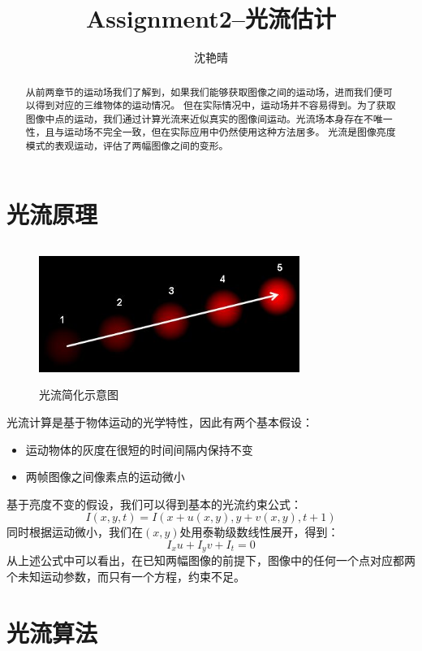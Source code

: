 \documentclass[UTF8]{ctexart}
\author{沈艳晴}
\title{Assignment2--光流估计}
\begin{document}
\begin{CJK*}{UTF8}{gbsn}
\CJKindent%
\maketitle


\begin{abstract}
从前两章节的运动场我们了解到，如果我们能够获取图像之间的运动场，进而我们便可以得到对应的三维物体的运动情况。
但在实际情况中，运动场并不容易得到。为了获取图像中点的运动，我们通过计算光流来近似真实的图像间运动。光流场本身存在不唯一性，且与运动场不完全一致，但在实际应用中仍然使用这种方法居多。
光流是图像亮度模式的表观运动，评估了两幅图像之间的变形。
\end{abstract}

\section{光流原理}\label{sec1}
\begin{figure}[htbp]
    \centering
    \includegraphics[height=4.5cm,width=8.5cm]{optical_flow_basic1.jpg}
    \caption{光流简化示意图}
    \label{fig:opti1}
\end{figure}
光流计算是基于物体运动的光学特性，因此有两个基本假设：
\begin{itemize}
    \item 运动物体的灰度在很短的时间间隔内保持不变
    \item 两帧图像之间像素点的运动微小
\end{itemize}
基于亮度不变的假设，我们可以得到基本的光流约束公式：
\begin{equation}
    I(x,y,t) = I(x+u(x,y),y+v(x,y),t+1)
\end{equation}
同时根据运动微小，我们在$(x,y)$处用泰勒级数线性展开，得到：
\begin{equation}
    I_{x} u + I_{y} v +I_{t} =0
\end{equation}
从上述公式中可以看出，在已知两幅图像的前提下，图像中的任何一个点对应都两个未知运动参数，而只有一个方程，约束不足。
\section{光流算法}


\end{CJK*}
\end{document}
